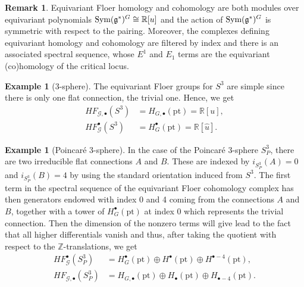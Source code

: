 \documentclass[11pt,colorinlistoftodos]{amsart}
\numberwithin{equation}{subsection}
\theoremstyle{plain}
\theoremstyle{definition}
\newtheorem{rem}[thm]{Remark}
\newtheorem{ex}[thm]{Example}
\theoremstyle{remark}
\newcommand{\R}{\mathbb{R}}
\newcommand{\Z}{\mathbb{Z}}
\newcommand{\calG}{\mathcal{G}}
\newcommand{\Sym}{\textnormal{Sym}}
\begin{document}
\begin{rem}
Equivariant Floer homology and cohomology are both modules over equivariant polynomials $\Sym(\mathfrak{g}^*)^G\cong\R[u]$ and the action of $\Sym(\mathfrak{g}^*)^G$ is symmetric with respect to the pairing. Moreover, the complexes defining equivariant homology and cohomology are filtered by index and there is an associated spectral sequence, whose $E^1$ and $E_1$ terms are the equivariant (co)homology of the critical locus.
\end{rem}

\begin{ex}[3-sphere]
The equivariant Floer groups for $S^3$ are simple since there is only one flat connection, the trivial one. Hence, we get
\begin{align*}
HF_{\calG,\bullet}(S^3)&=H_{G,\bullet}(\mathrm{pt})=\R[u],\\
HF^\bullet_\calG(S^3)&=H^\bullet_G(\mathrm{pt})=\R[\hat{u}].
\end{align*}
\end{ex}

\begin{ex}[Poincar\'e $3$-sphere]
In the case of the Poincar\'e 3-sphere $S^3_P$, there are two irreducible flat connections $A$ and $B$. These are indexed by $i_{S^3_P}(A)=0$ and $i_{S^3_P}(B)=4$ by using the standard orientation induced from $S^3$. The first term in the spectral sequence of the equivariant Floer cohomology complex has then generators endowed with index 0 and 4 coming from the connections $A$ and $B$, together with a tower of $H^\bullet_G(\mathrm{pt})$ at index 0 which represents the trivial connection. Then the dimension of the nonzero terms will give lead to the fact that all higher differentials vanish and thus, after taking the quotient with respect to the $\Z$-translations, we get 
\begin{align*}
    HF^{\bullet}_\calG(S^3_P)&=H^\bullet_G(\mathrm{pt})\oplus H^\bullet(\mathrm{pt})\oplus H^{\bullet-4}(\mathrm{pt}),\\
    HF_{\calG,\bullet}(S^3_P)&=H_{G,\bullet}(\mathrm{pt})\oplus H_\bullet(\mathrm{pt})\oplus H_{\bullet-4}(\mathrm{pt}).
\end{align*}
\end{ex}
\end{document}
